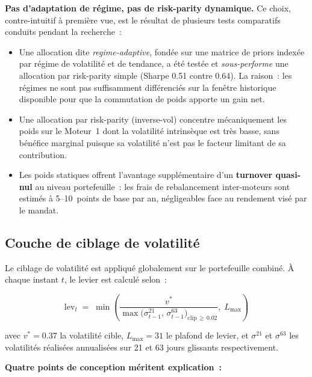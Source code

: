 \textbf{Pas d'adaptation de régime, pas de risk-parity dynamique.} Ce choix, contre-intuitif à première vue, est le résultat de plusieurs tests comparatifs conduits pendant la recherche~:

\begin{itemize}
\item Une allocation dite \emph{regime-adaptive}, fondée sur une matrice de priors indexée par régime de volatilité et de tendance, a été testée et \emph{sous-performe} une allocation par risk-parity simple (Sharpe 0.51 contre 0.64). La raison~: les régimes ne sont pas suffisamment différenciés sur la fenêtre historique disponible pour que la commutation de poids apporte un gain net.
\item Une allocation par risk-parity (inverse-vol) concentre mécaniquement les poids sur le Moteur~1 dont la volatilité intrinsèque est très basse, sans bénéfice marginal puisque sa volatilité n'est pas le facteur limitant de sa contribution.
\item Les poids statiques offrent l'avantage supplémentaire d'un \textbf{turnover quasi-nul} au niveau portefeuille~: les frais de rebalancement inter-moteurs sont estimés à 5--10~points de base par an, négligeables face au rendement visé par le mandat.
\end{itemize}

\subsection{Couche de ciblage de volatilité}

Le ciblage de volatilité est appliqué globalement sur le portefeuille combiné. À chaque instant $t$, le levier est calculé selon~:

\[
\mathrm{lev}_t \;=\; \min\!\left( \frac{v^{*}}{\max\!\bigl(\sigma^{21}_{t-1},\, \sigma^{63}_{t-1}\bigr)_{\text{clip}\,\ge\,0.02}},\; L_{\max} \right)
\]

avec $v^{*} = 0.37$ la volatilité cible, $L_{\max} = 31$ le plafond de levier, et $\sigma^{21}$ et $\sigma^{63}$ les volatilités réalisées annualisées sur 21 et 63 jours glissants respectivement.

\textbf{Quatre points de conception méritent explication~:}

